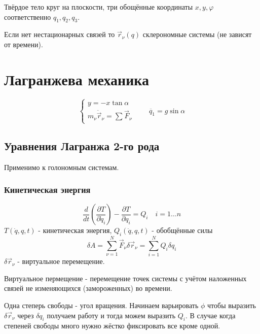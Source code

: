 \documentclass{article}
\begin{document}

\begin{eg}
  \phantom{.}

  Твёрдое тело круг на плоскости, три обощённые координаты $x,y,\varphi$ соответственно
  $q_1,q_2,q_3$.
\end{eg}
\begin{definition}
  Если нет нестационарных связей то $\vec{r}_\nu(q)$ склерономные системы
  (не зависят от времени).
\end{definition}

\section{Лагранжева механика}
 \phantom{.}
\[
  \left\{\begin{aligned}
    y = -x\tan \alpha \\ 
    m_{\nu}\ddot{\vec{r}}_{\nu}=\sum_{}^{}\vec{F}_{\nu}
  \end{aligned}\right. \qquad \ddot{q_1}=g\sin\alpha
\]
\subsection{Уравнения Лагранжа 2-го рода}
Применимо к голономным системам.
\subsubsection{Кинетическая энергия}
\[
  \frac{d}{dt}\left(\frac{\partial T}{\partial \dot{q}_i}\right)-\frac{\partial T}{\partial q_i}=Q_i \quad i=1\dots n 
\]
$T(\dot{q},q,t)$ - кинетическая энергия, $Q_i(\dot{q},q,t)$ - обобщённые силы
\[
  \delta A =\sum_{\nu=1}^{N}\vec{F}_\nu \delta \vec{r}_\nu=\sum_{i=1}^{N}Q_i \delta q_i
\]
$\delta \vec{r}_\nu$ - виртуальное перемещение.
\begin{definition}
  Виртуальное пермещение - перемещение точек системы с учётом наложенных связей
  не изменяющихся (замороженных) во времени.
\end{definition}
\begin{eg}
  \phantom{.}

  Одна степерь свободы - угол вращения. Начинаем варьировать $\phi$ чтобы выразить
  $\delta \vec{r}_\nu$ через $\delta q_i$ получаем работу и тогда можем выразить
  $Q_i$. В случае когда степеней свободы много нужно жёстко
  фиксировать все кроме одной.
\end{eg}
\end{document}
